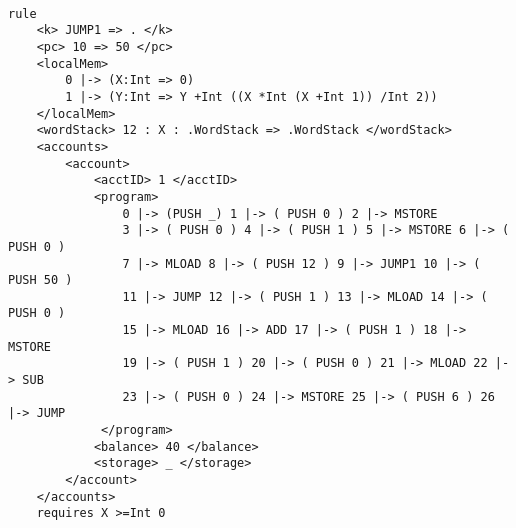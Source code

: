 \begin{verbatim}

rule
    <k> JUMP1 => . </k> 
    <pc> 10 => 50 </pc> 
    <localMem> 
    	0 |-> (X:Int => 0) 
    	1 |-> (Y:Int => Y +Int ((X *Int (X +Int 1)) /Int 2)) 
    </localMem>
    <wordStack> 12 : X : .WordStack => .WordStack </wordStack> 
    <accounts> 
        <account> 
            <acctID> 1 </acctID>
            <program> 
        		0 |-> (PUSH _) 1 |-> ( PUSH 0 ) 2 |-> MSTORE 
	            3 |-> ( PUSH 0 ) 4 |-> ( PUSH 1 ) 5 |-> MSTORE 6 |-> ( PUSH 0 ) 
	            7 |-> MLOAD 8 |-> ( PUSH 12 ) 9 |-> JUMP1 10 |-> ( PUSH 50 ) 
	            11 |-> JUMP 12 |-> ( PUSH 1 ) 13 |-> MLOAD 14 |-> ( PUSH 0 ) 
	            15 |-> MLOAD 16 |-> ADD 17 |-> ( PUSH 1 ) 18 |-> MSTORE 
	            19 |-> ( PUSH 1 ) 20 |-> ( PUSH 0 ) 21 |-> MLOAD 22 |-> SUB 
	            23 |-> ( PUSH 0 ) 24 |-> MSTORE 25 |-> ( PUSH 6 ) 26 |-> JUMP 
		     </program>
            <balance> 40 </balance>
            <storage> _ </storage>        
        </account> 
    </accounts> 
    requires X >=Int 0 
\end{verbatim}


